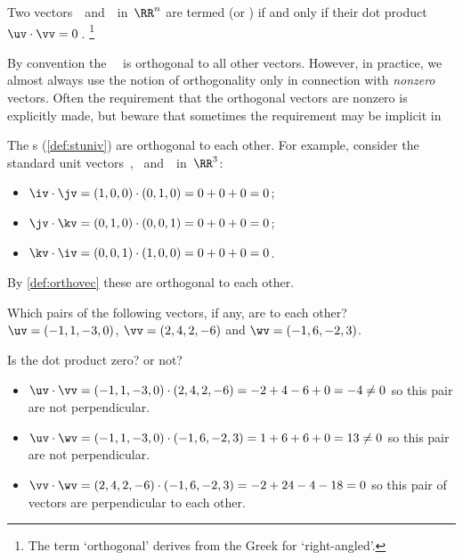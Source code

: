 \begin{definition} \label{def:orthovec}
Two vectors~\uv\ and~\vv\ in~\(\RR^n\) are termed
 (or )
if and only if their dot product \(\uv\cdot\vv=0\)\,.
\footnote{The term `orthogonal' derives from the Greek for `right-angled'.}
\end{definition}

By convention the ~\ov\ is orthogonal to all other vectors.
However, in practice, we almost always use the notion of orthogonality only in connection with \emph{nonzero} vectors.
Often the requirement that the orthogonal vectors are nonzero is explicitly made, but beware that sometimes the requirement may be implicit in 


\begin{example} 
The s (\cref{def:stuniv}) are orthogonal to each other.
For example, consider the standard unit vectors~\iv, \jv\ and~\kv\ in~\(\RR^3\):
%
\begin{itemize}
\item \(\iv\cdot\jv=(1,0,0)\cdot(0,1,0)=0+0+0=0\);
\item \(\jv\cdot\kv=(0,1,0)\cdot(0,0,1)=0+0+0=0\);
\item \(\kv\cdot\iv=(0,0,1)\cdot(1,0,0)=0+0+0=0\).
\end{itemize}
By \cref{def:orthovec} these are orthogonal to each other.
\end{example}


\begin{example} 
Which pairs of the following vectors, if any, are  to each other?
\(\uv=(-1,1,-3,0)\), \(\vv=(2,4,2,-6)\) and \(\wv=(-1,6,-2,3)\).
\begin{solution} 
Is the dot product zero? or not?
\begin{itemize}
\item \(\uv\cdot\vv =(-1,1,-3,0)\cdot(2,4,2,-6) =-2+4-6+0 =-4 \neq0\) so this pair are not perpendicular. 
\item \(\uv\cdot\wv =(-1,1,-3,0)\cdot(-1,6,-2,3) =1+6+6+0 =13 \neq0\) so this pair are not perpendicular. 
\item \(\vv\cdot\wv =(2,4,2,-6)\cdot(-1,6,-2,3) =-2+24-4-18 =0\) so this pair of vectors are perpendicular to each other. 
\end{itemize}
\end{solution}
\end{example}


